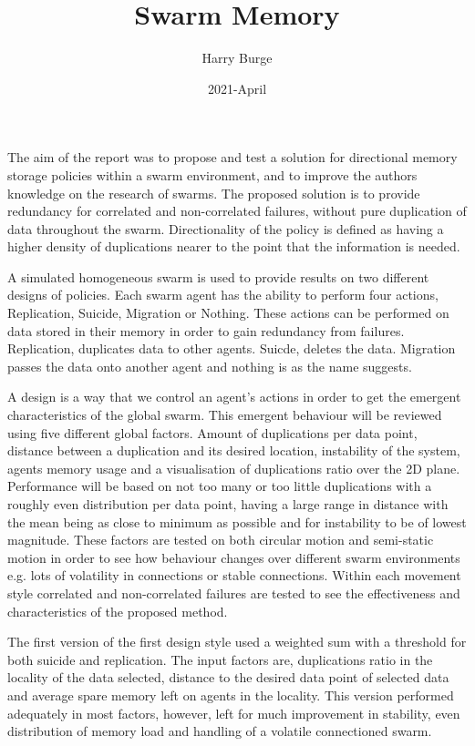 \documentclass{UoYCSproject}
\author{Harry Burge}
\title{Swarm Memory}
\date{2021-April}
\begin{document}
\maketitle
\listoffigures



\begin{summary}
The aim of the report was to propose and test a solution for directional memory storage policies within a swarm environment, and to improve the authors knowledge on the research of swarms. The proposed solution is to provide redundancy for correlated and non-correlated failures, without pure duplication of data throughout the swarm. Directionality of the policy is defined as having a higher density of duplications nearer to the point that the information is needed.

A simulated homogeneous swarm is used to provide results on two different designs of policies. Each swarm agent has the ability to perform four actions, Replication, Suicide, Migration or Nothing. These actions can be performed on data stored in their memory in order to gain redundancy from failures. Replication, duplicates data to other agents. Suicde, deletes the data. Migration passes the data onto another agent and nothing is as the name suggests. 

A design is a way that we control an agent's actions in order to get the emergent characteristics of the global swarm. This emergent behaviour will be reviewed using five different global factors. Amount of duplications per data point, distance between a duplication and its desired location, instability of the system, agents memory usage and a visualisation of duplications ratio over the 2D plane. Performance will be based on not too many or too little duplications with a roughly even distribution per data point, having a large range in distance with the mean being as close to minimum as possible and for instability to be of lowest magnitude. These factors are tested on both circular motion and semi-static motion in order to see how behaviour changes over different swarm environments e.g. lots of volatility in connections or stable connections. Within each movement style correlated and non-correlated failures are tested to see the effectiveness and characteristics of the proposed method.

The first version of the first design style used a weighted sum with a threshold for both suicide and replication. The input factors are, duplications ratio in the locality of the data selected, distance to the desired data point of selected data and average spare memory left on agents in the locality. This version performed adequately in most factors, however, left for much improvement in stability, even distribution of memory load and handling of a volatile connectioned swarm.


\end{summary}
\end{document}
